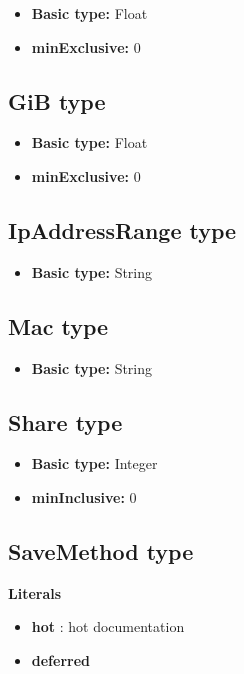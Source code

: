 \documentclass{article}
\begin{document}
\begin{itemize}
\item \textbf{Basic type:} Float
	\item \textbf{minExclusive:} 0
\end{itemize}
\subsection{GiB type}

\begin{itemize}
\item \textbf{Basic type:} Float
	\item \textbf{minExclusive:} 0
\end{itemize}
\subsection{IpAddressRange type}

\begin{itemize}
\item \textbf{Basic type:} String
\end{itemize}
\subsection{Mac type}

\begin{itemize}
\item \textbf{Basic type:} String
\end{itemize}
\subsection{Share type}

\begin{itemize}
\item \textbf{Basic type:} Integer
	\item \textbf{minInclusive:} 0
\end{itemize}
\subsection{SaveMethod type}

\textbf{Literals}
\begin{itemize}
\item \textbf{hot}   : hot documentation
\end{itemize}
\begin{itemize}
\item \textbf{deferred} 
\end{itemize}
\end{document}
